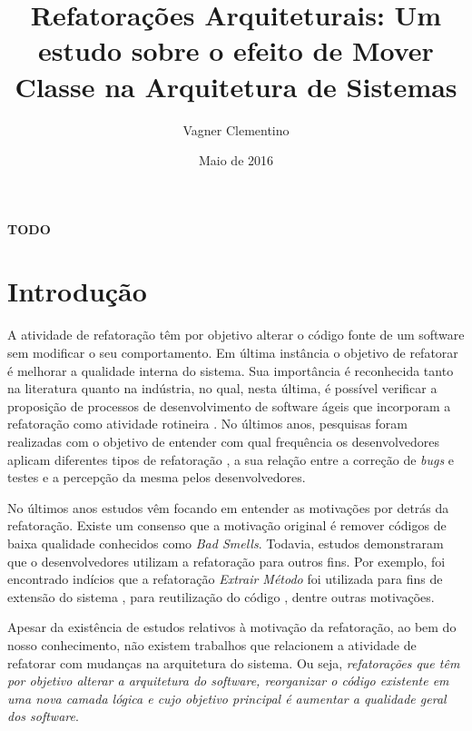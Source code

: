 \documentclass[12pt]{article}
\title{Refatorações Arquiteturais: Um estudo sobre o efeito de Mover Classe na Arquitetura de Sistemas}
\author{Vagner Clementino\inst{1}}
\date{Maio de 2016}
\begin{document}
\maketitle


\begin{resumo}
 \textbf{TODO}
\end{resumo}


\section{Introdução}
\label{sec:intro}

A atividade de refatoração têm por objetivo alterar o código fonte de um software sem modificar o seu comportamento. Em última instância o objetivo de refatorar é melhorar a qualidade interna do sistema\cite{1999:RID:311424,Opdyke:1992:ROF:169783}. Sua importância é reconhecida tanto na literatura quanto na indústria, no qual, nesta última, é possível verificar a proposição de processos de desenvolvimento de software ágeis que incorporam a refatoração como atividade rotineira \cite{Beck:2000:PEP:557458}. No últimos anos, pesquisas foram realizadas com o objetivo de entender com qual frequência os desenvolvedores aplicam diferentes tipos de refatoração \cite{Murphy-Hill:2009:WRW:1555001.1555044}, a sua relação entre a correção de \textit{bugs}\cite{Kim:2011:EIR:1985793.1985815} e testes \cite{Kim:2012:EII:2473496.2473590} e a percepção da mesma pelos desenvolvedores\cite{Kim:2012:FSR:2393596.2393655}.

No últimos anos estudos vêm focando em entender as motivações por detrás da refatoração. Existe um consenso que a motivação original é remover códigos de baixa qualidade conhecidos como \textit{Bad Smells}\cite{1999:RID:311424}. Todavia, estudos demonstraram que o desenvolvedores utilizam a refatoração para outros fins. Por exemplo, foi encontrado indícios que a refatoração \textit{Extrair Método} foi utilizada para fins de extensão do sistema \cite{Tsantalis2013}, para reutilização do código \cite{Danilo}, dentre outras motivações.

Apesar da existência de estudos relativos à motivação da refatoração, ao bem do nosso conhecimento, não existem trabalhos que relacionem a atividade de refatorar com mudanças na arquitetura do sistema. Ou seja, \textit{refatorações que têm por objetivo alterar a arquitetura do software, reorganizar o código existente em uma nova camada lógica e cujo objetivo principal é aumentar a qualidade geral dos software}.





\end{document}
